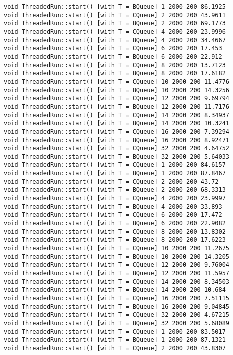 \begin{verbatim}
void ThreadedRun::start() [with T = BQueue] 1 2000 200 86.1925
void ThreadedRun::start() [with T = CQueue] 2 2000 200 43.9611
void ThreadedRun::start() [with T = BQueue] 2 2000 200 69.1773
void ThreadedRun::start() [with T = CQueue] 4 2000 200 23.9996
void ThreadedRun::start() [with T = BQueue] 4 2000 200 34.4667
void ThreadedRun::start() [with T = CQueue] 6 2000 200 17.453
void ThreadedRun::start() [with T = BQueue] 6 2000 200 22.912
void ThreadedRun::start() [with T = CQueue] 8 2000 200 13.7123
void ThreadedRun::start() [with T = BQueue] 8 2000 200 17.6182
void ThreadedRun::start() [with T = CQueue] 10 2000 200 11.4776
void ThreadedRun::start() [with T = BQueue] 10 2000 200 14.3256
void ThreadedRun::start() [with T = CQueue] 12 2000 200 9.69794
void ThreadedRun::start() [with T = BQueue] 12 2000 200 11.7176
void ThreadedRun::start() [with T = CQueue] 14 2000 200 8.34937
void ThreadedRun::start() [with T = BQueue] 14 2000 200 10.3241
void ThreadedRun::start() [with T = CQueue] 16 2000 200 7.39294
void ThreadedRun::start() [with T = BQueue] 16 2000 200 8.92471
void ThreadedRun::start() [with T = CQueue] 32 2000 200 4.64752
void ThreadedRun::start() [with T = BQueue] 32 2000 200 5.64033
void ThreadedRun::start() [with T = CQueue] 1 2000 200 84.6157
void ThreadedRun::start() [with T = BQueue] 1 2000 200 87.8467
void ThreadedRun::start() [with T = CQueue] 2 2000 200 43.72
void ThreadedRun::start() [with T = BQueue] 2 2000 200 68.3313
void ThreadedRun::start() [with T = CQueue] 4 2000 200 23.9997
void ThreadedRun::start() [with T = BQueue] 4 2000 200 33.893
void ThreadedRun::start() [with T = CQueue] 6 2000 200 17.472
void ThreadedRun::start() [with T = BQueue] 6 2000 200 22.9082
void ThreadedRun::start() [with T = CQueue] 8 2000 200 13.8302
void ThreadedRun::start() [with T = BQueue] 8 2000 200 17.6223
void ThreadedRun::start() [with T = CQueue] 10 2000 200 11.2675
void ThreadedRun::start() [with T = BQueue] 10 2000 200 14.3205
void ThreadedRun::start() [with T = CQueue] 12 2000 200 9.76004
void ThreadedRun::start() [with T = BQueue] 12 2000 200 11.5957
void ThreadedRun::start() [with T = CQueue] 14 2000 200 8.34503
void ThreadedRun::start() [with T = BQueue] 14 2000 200 10.684
void ThreadedRun::start() [with T = CQueue] 16 2000 200 7.51115
void ThreadedRun::start() [with T = BQueue] 16 2000 200 9.04845
void ThreadedRun::start() [with T = CQueue] 32 2000 200 4.67215
void ThreadedRun::start() [with T = BQueue] 32 2000 200 5.68089
void ThreadedRun::start() [with T = CQueue] 1 2000 200 83.5017
void ThreadedRun::start() [with T = BQueue] 1 2000 200 87.1321
void ThreadedRun::start() [with T = CQueue] 2 2000 200 43.8307

\end{verbatim}
